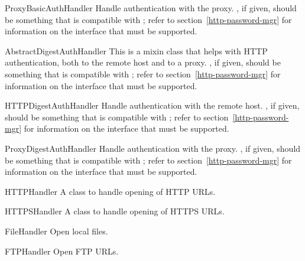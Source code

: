\begin{classdesc}{ProxyBasicAuthHandler}{}
Handle authentication with the proxy.
, if given, should be something that is compatible
with ; refer to section~\ref{http-password-mgr}
for information on the interface that must be supported.
\end{classdesc}

\begin{classdesc}{AbstractDigestAuthHandler}{}
This is a mixin class that helps with HTTP authentication, both
to the remote host and to a proxy.
, if given, should be something that is compatible
with ; refer to section~\ref{http-password-mgr}
for information on the interface that must be supported.
\end{classdesc}

\begin{classdesc}{HTTPDigestAuthHandler}{}
Handle authentication with the remote host.
, if given, should be something that is compatible
with ; refer to section~\ref{http-password-mgr}
for information on the interface that must be supported.
\end{classdesc}

\begin{classdesc}{ProxyDigestAuthHandler}{}
Handle authentication with the proxy.
, if given, should be something that is compatible
with ; refer to section~\ref{http-password-mgr}
for information on the interface that must be supported.
\end{classdesc}

\begin{classdesc}{HTTPHandler}{}
A class to handle opening of HTTP URLs.
\end{classdesc}

\begin{classdesc}{HTTPSHandler}{}
A class to handle opening of HTTPS URLs.
\end{classdesc}

\begin{classdesc}{FileHandler}{}
Open local files.
\end{classdesc}

\begin{classdesc}{FTPHandler}{}
Open FTP URLs.
\end{classdesc}

